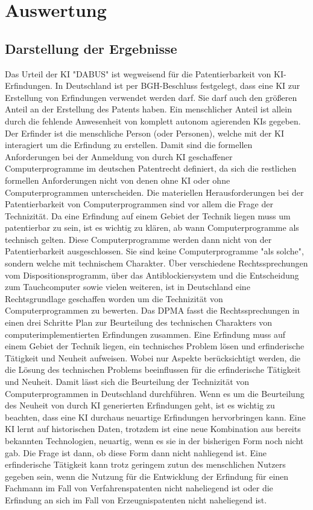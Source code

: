 \chapter{Auswertung\label{cha:chapter6}}

\section{Darstellung der Ergebnisse}
Das Urteil der KI "DABUS" ist wegweisend für die Patentierbarkeit von
KI-Erfindungen. In Deutschland ist per BGH-Beschluss 
festgelegt, dass eine KI
zur Erstellung von Erfindungen verwendet werden darf. Sie
darf auch den größeren Anteil an der Erstellung des Patents
haben. Ein menschlicher Anteil ist allein durch die 
fehlende Anwesenheit von komplett autonom agierenden KIs gegeben.
Der Erfinder ist die menschliche Person (oder Personen),
welche mit der KI interagiert um die Erfindung zu erstellen.
Damit sind die formellen Anforderungen bei der Anmeldung
von durch KI geschaffener Computerprogramme im deutschen
Patentrecht definiert, da sich die restlichen formellen
Anforderungen nicht von denen 
ohne KI oder ohne Computerprogrammen unterscheiden.
Die materiellen Herausforderungen bei der Patentierbarkeit
von Computerprogrammen sind vor allem die Frage der Technizität.
Da eine Erfindung auf einem Gebiet der Technik liegen muss
um patentierbar zu sein, ist es wichtig zu klären, ab wann
Computerprogramme als technisch gelten.
Diese Computerprogramme werden dann nicht von der Patentierbarkeit
ausgeschlossen. Sie sind keine Computerprogramme "als solche",
sondern welche mit technischem Charakter.
Über verschiedene Rechtssprechungen vom Dispositionsprogramm, über
das Antiblockiersystem und die Entscheidung zum Tauchcomputer sowie 
vielen weiteren, ist in Deutschland eine Rechtsgrundlage geschaffen worden
um die Technizität von Computerprogrammen zu bewerten.
Das DPMA fasst die Rechtssprechungen in einen drei Schritte Plan 
zur Beurteilung des technischen 
Charakters von computerimplementierten Erfindungen zusammen.
Eine Erfindung muss auf einem Gebiet der Technik liegen,
ein technisches Problem lösen und erfinderische Tätigkeit und Neuheit 
aufweisen. Wobei nur Aspekte berücksichtigt werden,
die die Lösung des technischen Problems beeinflussen für die
erfinderische Tätigkeit und Neuheit.
Damit lässt sich die Beurteilung der Technizität
von Computerprogrammen in Deutschland durchführen.
Wenn es um die Beurteilung des Neuheit von durch KI generierten 
Erfindungen geht, ist es wichtig zu beachten, dass eine KI 
durchaus neuartige Erfindungen hervorbringen kann.
Eine KI lernt auf historischen Daten, trotzdem ist
eine neue Kombination aus bereits bekannten Technologien, 
neuartig, wenn es sie in der bisherigen Form noch nicht gab. 
Die Frage ist dann, ob diese Form dann nicht nahliegend ist.
Eine erfinderische Tätigkeit kann trotz geringem 
zutun des menschlichen Nutzers gegeben sein, wenn 
die Nutzung für die Entwicklung der Erfindung für einen Fachmann 
im Fall von Verfahrenspatenten
nicht naheliegend ist 
oder die Erfindung an sich im Fall von Erzeugnispatenten 
nicht naheliegend ist.

